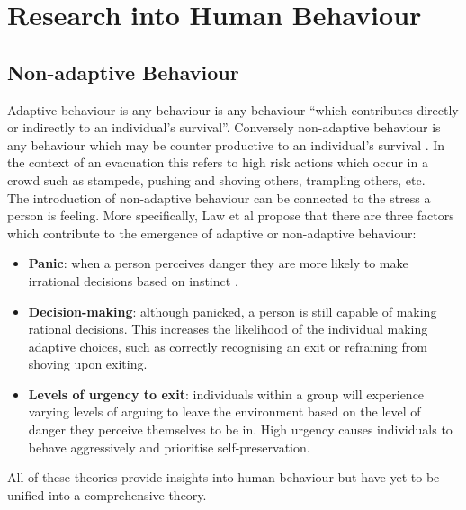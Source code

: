 %

\section{Research into Human Behaviour}
\label{Res:sec:humanBehaviour}
\subsection{Non-adaptive Behaviour}
\label{Res:subsec:nonadaptive}
Adaptive behaviour is any behaviour is any behaviour ``which contributes directly or indirectly to an individual's survival''.
Conversely non-adaptive behaviour is any behaviour which may be counter productive to an individual's survival \cite{AdaptiveBehaviourWiki}.
In the context of an evacuation this refers to high risk actions which occur in a crowd such as stampede, pushing and shoving others,
trampling others, etc.\\
The introduction of non-adaptive behaviour can be connected to the stress a person is feeling. More specifically, Law et al \cite{CIFEResearchProposal} propose that there are three factors which contribute to the emergence of adaptive or non-adaptive behaviour:
\begin{itemize}
  \item{\textbf{Panic}: when a person perceives danger they are more likely to make irrational decisions based on instinct \cite{PanMASSEgressThesis}.}
  \item{\textbf{Decision-making}: although panicked, a person is still capable of making rational decisions. This increases the likelihood of the individual making adaptive choices, such as correctly recognising an exit or refraining from shoving upon exiting.}
  \item{\textbf{Levels of urgency to exit}: individuals within a group will experience varying levels of arguing to leave the environment based on the level of danger they perceive themselves to be in. High urgency causes individuals to behave aggressively and prioritise self-preservation.}
\end{itemize}
All of these theories provide insights into human behaviour but have yet to be unified into a comprehensive theory.

